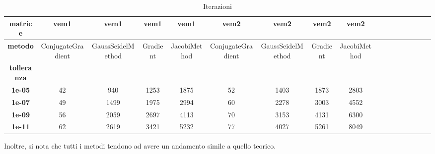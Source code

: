\begin{table}[!ht]
\begin{subtable}[!ht]{1\textwidth}
{\begin{tabular}{|c|c|c|c|c|c|c|c|c|c|c|c|c|c|c|c|c|}
                \textbf{matrice}    & \textbf{vem1}     & \textbf{vem1}     & \textbf{vem1} & \textbf{vem1} & \textbf{vem2}     & \textbf{vem2}     & \textbf{vem2} & \textbf{vem2} \\ \hline
                \textbf{metodo}     & ConjugateGradient & GaussSeidelMethod & Gradient      & JacobiMethod  & ConjugateGradient & GaussSeidelMethod & Gradient      & JacobiMethod  \\
                \textbf{tolleranza} & ~                 & ~                 & ~             & ~             & ~                 & ~                 & ~             & ~             \\
                \textbf{1e-05}      & 42                & 940               & 1253          & 1875          & 52                & 1403              & 1873          & 2803          \\
                \textbf{1e-07}      & 49                & 1499              & 1975          & 2994          & 60                & 2278              & 3003          & 4552          \\
                \textbf{1e-09}      & 56                & 2059              & 2697          & 4113          & 70                & 3153              & 4131          & 6300          \\
                \textbf{1e-11}      & 62                & 2619              & 3421          & 5232          & 77                & 4027              & 5261          & 8049          \\
            \end{tabular}}
        \caption{Vem 1 e Vem 2}
        \label{tab:vem}
    \end{subtable}
    \caption{Iterazioni}
    \label{tab:iterazioni}
\end{table}
Inoltre, si nota che tutti i metodi tendono ad avere un andamento simile a quello
teorico.

